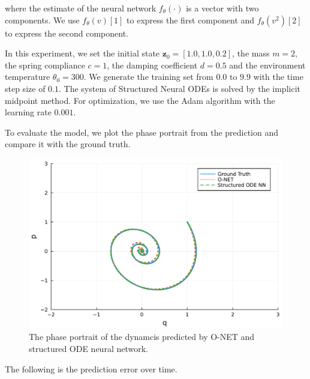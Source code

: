 \documentclass[
	parskip, 			   %
	twoside, 			   %
	DIV=14, 			   %
	BCOR=15.0mm, 		   %
	headsepline, 		   %
	open=right, 		   %
	captions=tableheading, %
	bibliography=totoc,    %
	numbers=noenddot       %
]{scrreprt}
\begin{document}
where the estimate of the neural network $f_{\theta}(\cdot)$ is a vector with two components. We use $f_{\theta}(v)[1]$ to express the first component and $f_{\theta}(v^2)[2]$ to express the second component.

In this experiment, we set the initial state $\mathbf{z}_0 = [1.0, 1.0, 0.2]$, the mass $m = 2$, the spring compliance $c = 1$, the damping coefficient $d=0.5$ and the environment temperature $\theta_0=300$. We generate the training set from $0.0$ to $9.9$ with the time step size of $0.1$. The system of Structured Neural ODEs is solved by the implicit midpoint method. For optimization, we use the Adam algorithm with the learning rate $0.001$.

To evaluate the model, we plot the phase portrait from the prediction and compare it with the ground truth.

\clearpage
\begin{figure}[h!]
    \centering
    \includegraphics[scale=0.5]{figures/phase_portrait_idho_O_NET_and_structured_ODE_NN.pdf}
    \caption{The phase portrait of the dynamcis predicted by O-NET and structured ODE neural network.}
    \label{fig:phase_portrait_idho_O_NET_and_structured_ODE_NN}
\end{figure}

The following is the prediction error over time.
\end{document}
